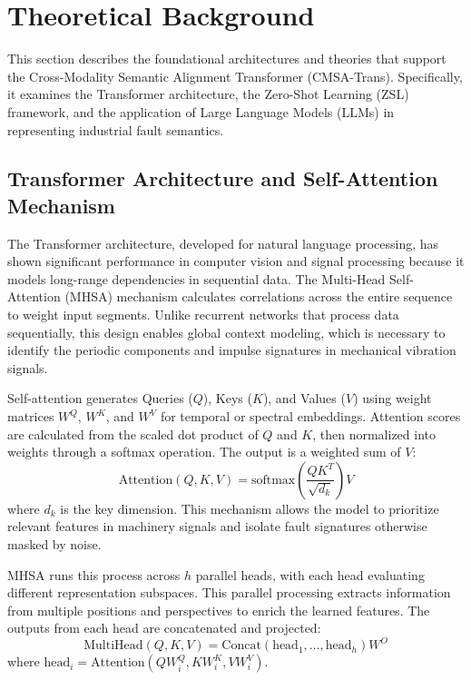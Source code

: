 \section{Theoretical Background}
This section describes the foundational architectures and theories that support the Cross-Modality Semantic Alignment Transformer (CMSA-Trans). Specifically, it examines the Transformer architecture, the Zero-Shot Learning (ZSL) framework, and the application of Large Language Models (LLMs) in representing industrial fault semantics.

\subsection{Transformer Architecture and Self-Attention Mechanism}
The Transformer architecture, developed for natural language processing, has shown significant performance in computer vision and signal processing because it models long-range dependencies in sequential data. The Multi-Head Self-Attention (MHSA) mechanism calculates correlations across the entire sequence to weight input segments. Unlike recurrent networks that process data sequentially, this design enables global context modeling, which is necessary to identify the periodic components and impulse signatures in mechanical vibration signals.

Self-attention generates Queries ($Q$), Keys ($K$), and Values ($V$) using weight matrices $W^Q$, $W^K$, and $W^V$ for temporal or spectral embeddings. Attention scores are calculated from the scaled dot product of $Q$ and $K$, then normalized into weights through a softmax operation. The output is a weighted sum of $V$:
\begin{equation}
\text{Attention}(Q, K, V) = \text{softmax}\left(\frac{QK^T}{\sqrt{d_k}}\right)V
\end{equation}
where $d_k$ is the key dimension. This mechanism allows the model to prioritize relevant features in machinery signals and isolate fault signatures otherwise masked by noise.

MHSA runs this process across $h$ parallel heads, with each head evaluating different representation subspaces. This parallel processing extracts information from multiple positions and perspectives to enrich the learned features. The outputs from each head are concatenated and projected:
\begin{equation}
\text{MultiHead}(Q, K, V) = \text{Concat}(\text{head}_1, \dots, \text{head}_h)W^O
\end{equation}
where $\text{head}_i = \text{Attention}(QW_i^Q, KW_i^K, VW_i^V)$.

